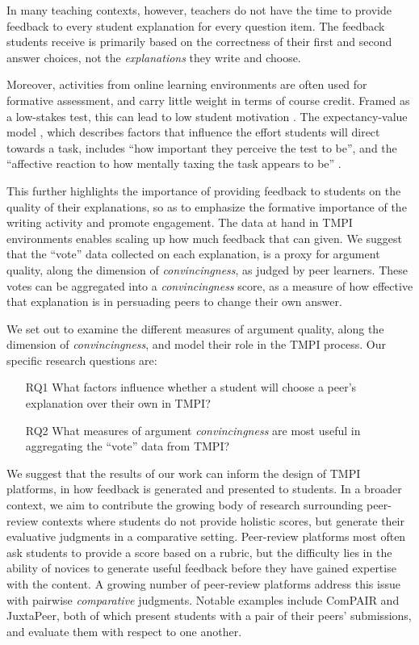 \documentclass[sigconf]{acmart}
\begin{document}
In many teaching contexts, however, teachers do not have the time to provide 
feedback to every student explanation for every question item. 
The feedback students receive is primarily based on the correctness of their 
first and second answer choices, not the \textit{explanations} they write and 
choose.

Moreover, activities from online learning environments are often used for 
formative assessment, and carry little weight in terms of course credit. 
Framed as a low-stakes test, this can lead to low student motivation 
\cite{wise_low_2005}. 
The expectancy-value model \cite{pintrich_dynamic_1989}, which describes 
factors that influence the effort students will direct towards a task, includes 
``how important they perceive the test to be'', and the ``affective reaction to 
how mentally taxing the task appears to be'' \cite{wolf_consequence_1995}.

This further highlights the importance of providing feedback to students on the 
quality of their explanations, so as to emphasize the formative importance of 
the writing activity and promote engagement.
The data at hand in TMPI environments enables scaling up how much feedback that 
can given.
We suggest that the ``vote'' data collected on each explanation, is a proxy for 
argument quality, along the dimension of \textit{convincingness}, as judged by 
peer learners. 
These votes can be aggregated into a \textit{convincingness} score, as a 
measure of how effective that explanation is in persuading peers to change 
their own answer.

We set out to examine the different measures of argument quality, along the 
dimension of \textit{convincingness}, and model their role in the TMPI process. 
Our specific research questions are:
\begin{itemize}
	\item[RQ1] What factors influence whether a student will choose a peer's 
	explanation over their own in TMPI?
	\item[RQ2] What measures of argument \textit{convincingness} are most 
	useful in aggregating the ``vote'' data from TMPI?
\end{itemize}

We suggest that the results of our work can inform the design of TMPI 
platforms, in how feedback is generated and presented to students. 
In a broader context, we aim to contribute the growing body of research 
surrounding peer-review contexts where students do not provide holistic scores, 
but generate their evaluative judgments in a comparative setting.
Peer-review platforms most often ask students to provide a score based on a 
rubric, but the difficulty lies in the ability of novices to generate useful 
feedback before they have gained expertise with the content. 
A growing number of peer-review platforms address this issue with pairwise
\textit{comparative} judgments.
Notable examples include ComPAIR\cite{potter_compair:_2017} and 
JuxtaPeer\cite{cambre_juxtapeer:_2018}, both of which present students with a 
pair of their peers' submissions, and evaluate them with respect to one another.
\end{document}
